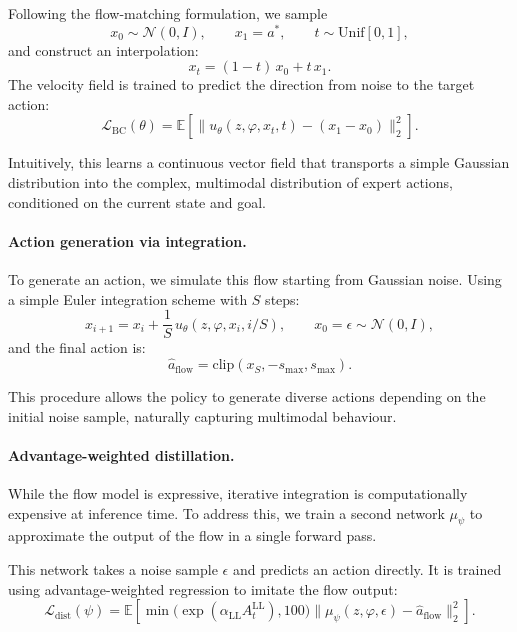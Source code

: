 Following the flow-matching formulation, we sample
\[
x_0 \sim \mathcal{N}(0,I), \qquad x_1 = a^*, \qquad t \sim \mathrm{Unif}[0,1],
\]
and construct an interpolation:
\[
x_t = (1 - t)\,x_0 + t\,x_1.
\]
The velocity field is trained to predict the direction from noise to the
target action:
\begin{equation}
\mathcal{L}_{\mathrm{BC}}(\theta)
= \mathbb{E}\!\left[
\big\| u_\theta(z, \varphi, x_t, t) - (x_1 - x_0) \big\|_2^2
\right].
\label{eq:flow-bc-clean}
\end{equation}

Intuitively, this learns a continuous vector field that transports a
simple Gaussian distribution into the complex, multimodal distribution
of expert actions, conditioned on the current state and goal.

\paragraph{Action generation via integration.}
To generate an action, we simulate this flow starting from Gaussian
noise. Using a simple Euler integration scheme with $S$ steps:
\begin{equation}
x_{i+1} = x_i + \frac{1}{S}\,u_\theta(z, \varphi, x_i, i/S),
\qquad x_0 = \epsilon \sim \mathcal{N}(0,I),
\end{equation}
and the final action is:
\begin{equation}
\hat{a}_{\mathrm{flow}} = \mathrm{clip}(x_S, -s_{\max}, s_{\max}).
\label{eq:flow-euler-clean}
\end{equation}

This procedure allows the policy to generate diverse actions depending
on the initial noise sample, naturally capturing multimodal behaviour.

\paragraph{Advantage-weighted distillation.}
While the flow model is expressive, iterative integration is
computationally expensive at inference time. To address this, we train a
second network $\mu_\psi$ to approximate the output of the flow in a
single forward pass.

This network takes a noise sample $\epsilon$ and predicts an action
directly. It is trained using advantage-weighted regression to imitate
the flow output:
\begin{equation}
\mathcal{L}_{\mathrm{dist}}(\psi)
= \mathbb{E}\!\left[
\min\big(\exp(\alpha_{\mathrm{LL}} A^{\mathrm{LL}}_t), 100\big)
\|\mu_\psi(z, \varphi, \epsilon) - \hat{a}_{\mathrm{flow}}\|_2^2
\right].
\label{eq:flow-dist-clean}
\end{equation}

